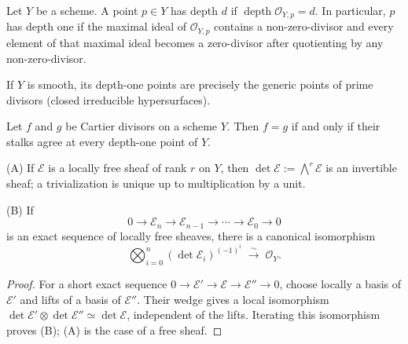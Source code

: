 \begin{definition}\label{fga-def-7-1-9}\uses{}
Let $Y$ be a scheme.  A point $p\in Y$ has depth $d$ if
$\operatorname{depth}\mathcal O_{Y,p}=d$.  In particular, $p$ has depth one if
the maximal ideal of $\mathcal O_{Y,p}$ contains a non-zero-divisor and every
element of that maximal ideal becomes a zero-divisor after quotienting by any
non-zero-divisor.
\end{definition}

\begin{remark}\label{fga-rem-7-1-10}
If $Y$ is smooth, its depth-one points are precisely the generic points of
prime divisors (closed irreducible hypersurfaces).
\end{remark}

\begin{lemma}\label{fga-lem-7-1-11}
Let $f$ and $g$ be Cartier divisors on a scheme $Y$.  Then $f=g$ if and only if
their stalks agree at every depth-one point of $Y$.
\end{lemma}

\begin{lemma}\label{fga-lem-7-1-12}\uses{}
\textup{(A)} If $\mathcal E$ is a locally free sheaf of rank $r$ on $Y$, then
$\det\mathcal E:=\bigwedge^r\mathcal E$ is an invertible sheaf; a trivialization
is unique up to multiplication by a unit.

\textup{(B)} If
\[
0\longrightarrow\mathcal E_n\longrightarrow\mathcal E_{n-1}\longrightarrow\cdots
\longrightarrow\mathcal E_0\longrightarrow0
\]
is an exact sequence of locally free sheaves, there is a canonical isomorphism
\[
\bigotimes_{i=0}^{n}(\det\mathcal E_i)^{(-1)^i}\;\xrightarrow{\;\sim\;}\;\mathcal O_Y.
\]
\end{lemma}
\begin{proof}
For a short exact sequence $0\to\mathcal E'\to\mathcal E\to\mathcal E''\to0$,
choose locally a basis of $\mathcal E'$ and lifts of a basis of $\mathcal E''$.
Their wedge gives a local isomorphism
$\det\mathcal E'\otimes\det\mathcal E''\simeq\det\mathcal E$,
independent of the lifts.  Iterating this isomorphism proves (B); (A) is the
case of a free sheaf.
\end{proof}

